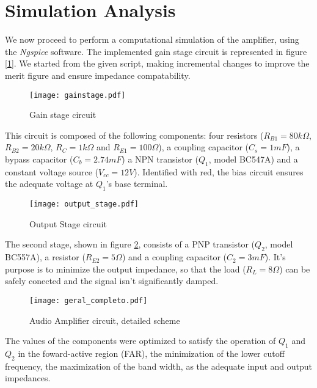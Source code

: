 \section{Simulation Analysis}
\label{sec:simulation}

\par We now proceed to perform a computational simulation of the amplifier, using the \textit{Ngspice} software. The implemented gain stage circuit is represented in figure [\ref{fig:gain_stage}]. We started from the given script, making incremental changes to improve the merit figure and ensure impedance compatability.  

\begin{figure}[H]
\centering
  \texttt{[image: gainstage.pdf]}
  \caption{Gain stage circuit}
  \label{fig:gain_stage}
\end{figure}

\par This circuit is composed of the following components: four resistors ($R_{B1}=80k\Omega$, $R_{B2}=20k\Omega$, $R_{C}=1k\Omega$ and $R_{E1}=100\Omega$), a coupling capacitor ($C_s = 1 mF$), a bypass capacitor ($C_b=2.74mF$) a NPN transistor ($Q_1$, model BC547A) and a constant voltage source ($V_{cc}=12V$). Identified with red, the bias circuit ensures the adequate voltage at $Q_1$'s base terminal.

\begin{figure}[H]
\centering
  \texttt{[image: output\_stage.pdf]}
  \caption{Output Stage circuit}
  \label{fig:output_stage}
\end{figure}

\par The second stage, shown in figure \ref{fig:output_stage}, consists of a PNP transistor ($Q_2$, model BC557A), a resistor ($R_{E2}=5\Omega$) and a coupling capacitor ($C_2=3mF$). It's purpose is to minimize the output impedance, so that the load ($R_L=8\Omega$) can be safely conected and the signal isn't significantly damped.

\begin{figure}[H]
\centering
  \texttt{[image: geral\_completo.pdf]}
  \caption{Audio Amplifier circuit, detailed scheme}
  \label{fig:complete_circuit}
\end{figure}

\par The values of the components were optimized to satisfy the operation of $Q_1$ and $Q_2$ in the foward-active region (FAR), the minimization of the lower cutoff frequency, the maximization of the band width, as the adequate input and output impedances.

